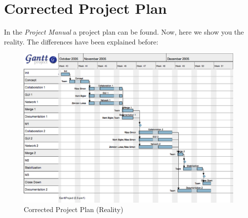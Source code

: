 \section{Corrected Project Plan}
In the \emph{Project Manual} a project plan can be found. Now, here we show
you the reality. The differences have been explained before:

\begin{figure}[H]
 \centering
 \includegraphics[width=20cm,width=14.27cm,angle=90]{../images/finalreport/projectplan/ace.eps}
 \caption{Corrected Project Plan (Reality)}
\end{figure}

